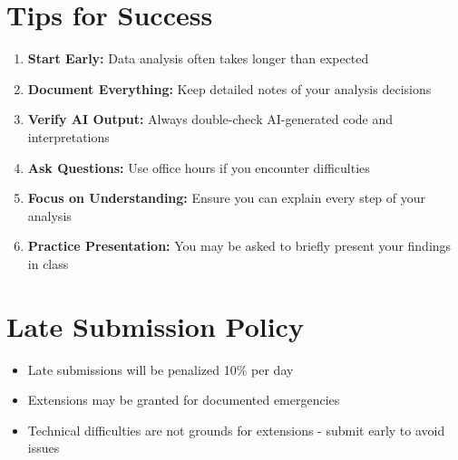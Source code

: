 \documentclass[11pt]{article}
\begin{document}
\section{Tips for Success}

\begin{enumerate}
\item \textbf{Start Early:} Data analysis often takes longer than expected
\item \textbf{Document Everything:} Keep detailed notes of your analysis decisions
\item \textbf{Verify AI Output:} Always double-check AI-generated code and interpretations
\item \textbf{Ask Questions:} Use office hours if you encounter difficulties
\item \textbf{Focus on Understanding:} Ensure you can explain every step of your analysis
\item \textbf{Practice Presentation:} You may be asked to briefly present your findings in class
\end{enumerate}

\section{Late Submission Policy}

\begin{itemize}
\item Late submissions will be penalized 10\% per day
\item Extensions may be granted for documented emergencies
\item Technical difficulties are not grounds for extensions - submit early to avoid issues
\end{itemize}
\end{document}

